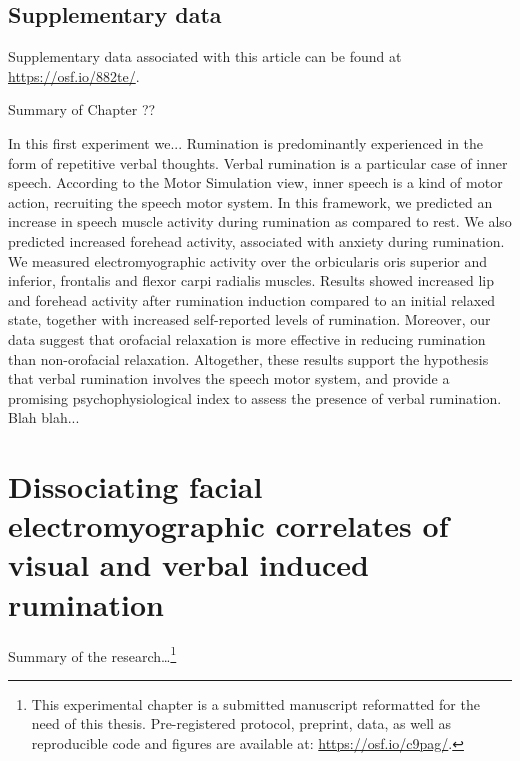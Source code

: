 \documentclass[a4paper,12pt,twoside,openright,oldfontcommands]{memoir}
\let\rmarkdownfootnote\footnote%
\def\footnote{\protect\rmarkdownfootnote}
\newcommand\getcurrentref[1]{
 \ifnumequal{\value{#1}}{0}
  {??}
  {\the\value{#1}}
}
\begin{document}
\hypertarget{suppCH3}{\section{Supplementary data}\label{suppCH3}}

Supplementary data associated with this article can be found at
\url{https://osf.io/882te/}.

\newpage

\begin{vplace}[1]

\begin{summary}{Summary of Chapter\getcurrentref{chapter}}

In this first experiment we... Rumination is predominantly experienced in the form of repetitive verbal thoughts. Verbal rumination is a particular case of inner speech. According to the Motor Simulation view, inner speech is a kind of motor action, recruiting the speech motor system. In this framework, we predicted an increase in speech muscle activity during rumination as compared to rest. We also predicted increased forehead activity, associated with anxiety during rumination. We measured electromyographic activity over the orbicularis oris superior and inferior, frontalis and flexor carpi radialis muscles. Results showed increased lip and forehead activity after rumination induction compared to an initial relaxed state, together with increased self-reported levels of rumination. Moreover, our data suggest that orofacial relaxation is more effective in reducing rumination than non-orofacial relaxation. Altogether, these results support the hypothesis that verbal rumination involves the speech motor system, and provide a promising psychophysiological index to assess the presence of verbal rumination.\\

Blah blah...

\end{summary}

\end{vplace}

\chapter{Dissociating facial electromyographic correlates of visual and
verbal induced
rumination}\label{dissociating-facial-electromyographic-correlates-of-visual-and-verbal-induced-rumination}

Summary of the research\ldots{}\footnote{This experimental chapter is a
  submitted manuscript reformatted for the need of this thesis.
  Pre-registered protocol, preprint, data, as well as reproducible code
  and figures are available at: \url{https://osf.io/c9pag/}.}
\end{document}
